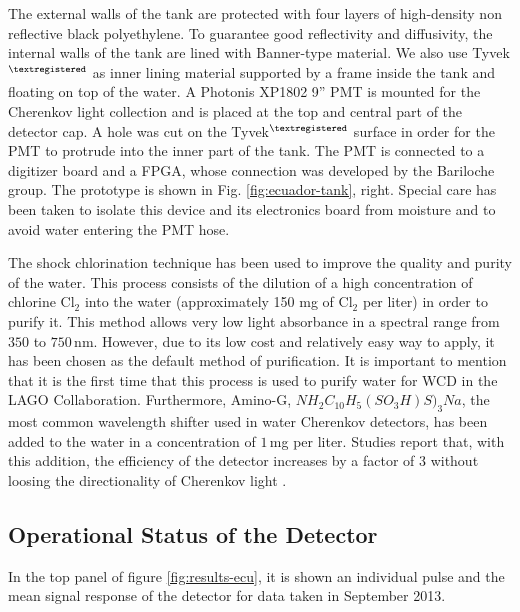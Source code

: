 The external walls of the tank are protected with four layers of high-density
non reflective black polyethylene. To guarantee good reflectivity and
diffusivity, the internal walls of the tank are lined with Banner-type
material. We also use Tyvek$^{\textregistered}$ as inner lining material
supported by a frame inside the tank and floating on top of the water. A
Photonis XP1802 9'' PMT is mounted for the Cherenkov light collection and
is placed at the top and central part of the detector cap. A hole was cut on
the Tyvek$^{\textregistered}$ surface in order for the PMT to protrude into the
inner part of the tank. The PMT is connected to a digitizer board and a FPGA,
whose connection was developed by the Bariloche group. The prototype is shown
in Fig. \ref{fig:ecuador-tank}, right. Special care has been taken to isolate this device
and its electronics board from moisture and to avoid water entering the PMT
hose. 

The shock chlorination technique has been used to improve the quality and
purity of the water. This process consists of the dilution of a high
concentration of chlorine Cl$_{2}$ into the water (approximately 150 mg of
Cl$_{2}$ per liter) in order to purify it. This method allows very low light
absorbance in a spectral range from $350$ to $750$\,nm. However, due to its low
cost and relatively easy way to apply, it has been chosen as the default method
of purification. It is important to mention that it is the first time that this
process is used to purify water for WCD in the LAGO Collaboration. Furthermore,
Amino-G, ${NH_{2}C_{10}H_{5}(SO_{3}H)S)_{3}Na}$, the most common wavelength
shifter used in water Cherenkov detectors, has been added to the water in a
concentration of $1$\,mg per liter. Studies report that, with this addition,
the efficiency of the detector increases by a factor of 3 without loosing the
directionality of Cherenkov light \cite{Badino1981}.

\subsection*{Operational Status of the Detector}

In the top panel of figure \ref{fig:results-ecu}, it is shown an individual
pulse and the mean signal response of the detector for data taken in September
2013.

